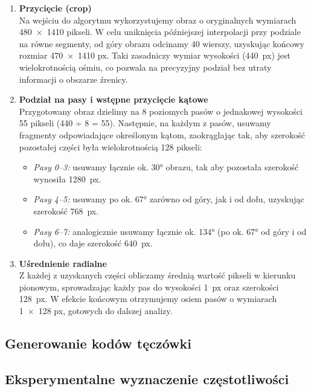 \documentclass[a4paper]{article}
\begin{document}
\begin{enumerate}
  \item \textbf{Przycięcie (crop)}\\
    Na wejściu do algorytmu wykorzystujemy obraz o oryginalnych wymiarach 480 × 1410 pikseli. W celu uniknięcia późniejszej interpolacji przy podziale na równe segmenty, od góry obrazu odcinamy 40 wierszy, uzyskując końcowy rozmiar 470 × 1410 px. Taki zasadniczy wymiar wysokości (440 px) jest wielokrotnością ośmiu, co pozwala na precyzyjny podział bez utraty informacji o obszarze źrenicy.

  \item \textbf{Podział na pasy i wstępne przycięcie kątowe}\\
    Przygotowany obraz dzielimy na 8 poziomych pasów o jednakowej wysokości 55 pikseli (440 ÷ 8 = 55). Następnie, na każdym z pasów, usuwamy fragmenty odpowiadające określonym kątom, zaokrąglając tak, aby szerokość pozostałej części była wielokrotnością 128 pikseli:
    \begin{itemize}
      \item \emph{Pasy 0–3:} usuwamy łącznie ok. 30° obrazu, tak aby pozostała szerokość wynosiła 1280 px.
      \item \emph{Pasy 4–5:} usuwamy po ok. 67° zarówno od góry, jak i od dołu, uzyskując szerokość 768 px.
      \item \emph{Pasy 6–7:} analogicznie usuwamy łącznie ok. 134° (po ok. 67° od góry i od dołu), co daje szerokość 640 px.
    \end{itemize}

  \item \textbf{Uśrednienie radialne}\\
    Z każdej z uzyskanych części obliczamy średnią wartość pikseli w kierunku pionowym, sprowadzając każdy pas do wysokości 1 px oraz szerokości 128 px. W efekcie końcowym otrzymujemy osiem pasów o wymiarach 1 × 128 px, gotowych do dalszej analizy.
\end{enumerate}

\subsection*{Generowanie kodów tęczówki}

\subsection*{Eksperymentalne wyznaczenie częstotliwości}
\end{document}
